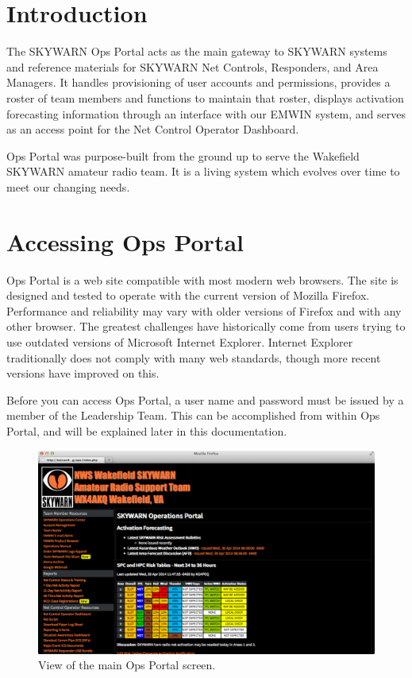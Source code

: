 \documentclass[pdflatex,letterpaper,twoside,12pt]{book}
\begin{document}

\section{Introduction}

The SKYWARN Ops Portal acts as the main gateway to SKYWARN systems and reference materials for SKYWARN Net Controls, Responders, and Area Managers.  It handles provisioning of user accounts and permissions, provides a roster of team members and functions to maintain that roster, displays activation forecasting information through an interface with our EMWIN system, and serves as an access point for the Net Control Operator Dashboard.

Ops Portal was purpose-built from the ground up to serve the Wakefield SKYWARN amateur radio team.  It is a living system which evolves over time to meet our changing needs.


\section{Accessing Ops Portal}\label{accessing-ops-portal}

Ops Portal is a web site compatible with most modern web browsers.  The site is designed and tested to operate with the current version of Mozilla Firefox.  Performance and reliability may vary with older versions of Firefox and with any other browser.  The greatest challenges have historically come from users trying to use outdated versions of Microsoft Internet Explorer.  Internet Explorer traditionally does not comply with many web standards, though more recent versions have improved on this.

Before you can access Ops Portal, a user name and password must be issued by a member of the Leadership Team.  This can be accomplished from within Ops Portal, and will be explained later in this documentation.

\begin{figure}[h!]
  \centering
  \includegraphics[width=\textwidth,keepaspectratio=true]{img/ops-main-screen}
  \caption{View of the main Ops Portal screen.\label{fig:ops-main-screen}}
\end{figure}
\end{document}
